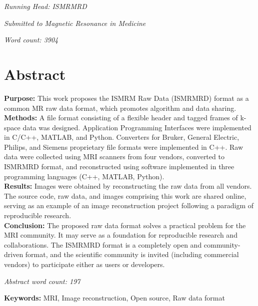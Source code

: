 \documentclass[12pt, draft]{article}
\begin{document}
\textit{Running Head:  ISMRMRD}


\textit{Submitted to Magnetic Resonance in Medicine} 


\textit{Word count: 3904} %

\newpage
\clearpage
{} %
\pagestyle{plain}
\doublespacing
\section*{Abstract}
\textbf{Purpose:}  This work proposes the ISMRM Raw Data (ISMRMRD) format as a common MR raw data format, which promotes algorithm and data sharing.\\
\textbf{Methods:} A file format consisting of a flexible header and tagged frames of k-space data was designed. Application Programming Interfaces were implemented in C/C++, MATLAB, and Python. Converters for Bruker, General Electric, Philips, and Siemens proprietary file formats were implemented in C++. Raw data were collected using MRI scanners from four vendors, converted to ISMRMRD format, and reconstructed using software implemented in three programming languages (C++, MATLAB, Python).\\
\textbf{Results:} Images were obtained by reconstructing the raw data from all vendors. The source code, raw data, and images comprising this work are shared online, serving as an example of an image reconstruction project following a paradigm of reproducible research.\\
\textbf{Conclusion:} The proposed raw data format solves a practical problem for the MRI community.  It may serve as a foundation for reproducible research and collaborations.  The ISMRMRD format is a completely open and community-driven format, and the scientific community is invited (including commercial vendors) to participate either as users or developers.

\textit{Abstract word count: 197} %

\textbf{Keywords:}  MRI, Image reconstruction, Open source, Raw data format
\end{document}
